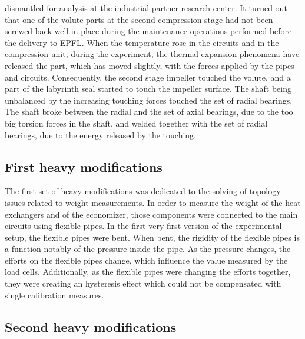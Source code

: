 dismantled for analysis at the industrial partner research center. It
turned out that one of the volute parts at the second compression
stage had not been screwed back well in place during the maintenance
operations performed before the delivery to EPFL. When the temperature
rose in the circuits and in the compression unit, during the
experiment, the thermal expansion phenomena have released the part,
which has moved slightly, with the forces applied by the \BWP{} pipes
and circuits. Consequently, the second stage impeller touched the volute,
and a part of the labyrinth seal started to touch the impeller
surface. The shaft being unbalanced by the increasing touching forces
touched the set of radial bearings. The shaft broke between the radial
and the set of axial bearings, due to the too big torsion forces in
the shaft, and welded together with the set of radial bearings, due to
the energy released by the touching.

\subsection{First heavy modifications}
\label{sec:bwp-redesign-1}

The first set of heavy modifications was dedicated to the solving of
topology issues related to weight measurements. In order to measure
the weight of the heat exchangers and of the economizer, those
components were connected to the main circuits using flexible
pipes. In the first very first version of the experimental setup, the
flexible pipes were bent. When bent, the rigidity of the flexible
pipes is a function notably of the pressure inside the pipe. As the
pressure changes, the efforts on the flexible pipes change, which
influence the value measured by the load cells. Additionally, as the
flexible pipes were changing the efforts together, they were creating
an hysteresis effect which could not be compensated with single
calibration measures.

\subsection{Second heavy modifications}
\label{sec:bwp-redesign-2}


